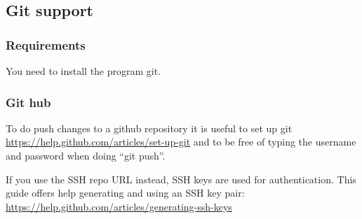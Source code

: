 \documentclass[11pt]{article}
\begin{document}
\subsection{Git support}
\label{sec-1-2}
\subsubsection{Requirements}
\label{sec-1-2-1}


You need to install the program git.
\subsubsection{Git hub}
\label{sec-1-2-2}


To do push changes to a github repository it is useful to set up git  
\href{https://help.github.com/articles/set-up-git}{https://help.github.com/articles/set-up-git}
and to be free of typing the username and password when doing ``git push''.

If you use the SSH repo URL instead, SSH keys are used for
authentication. This guide offers help generating and using an SSH key
pair:  \href{https://help.github.com/articles/generating-ssh-keys}{https://help.github.com/articles/generating-ssh-keys}
\end{document}
